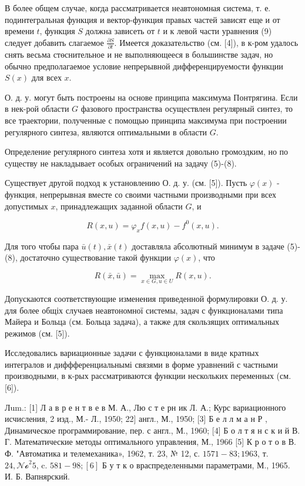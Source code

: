\documentclass[10pt]{article}
\begin{document}
В более общем случае, когда рассматривается неавтономная система, т. е. подинтегральная функция и вектор-функция правых частей зависят еще и от времени $t$, функция $S$ должна зависеть от $t$ и к левой части уравнения (9) следует добавить слагаемое $\frac{\partial S}{\partial t}$. Имеется доказательство (см. [4]), в к-ром удалось снять весьма стөснительное и не выполняющееся в большинстве задач, но обычно предполагаемое условие непрерывной дифференцируемости функции $S(x)$ для всех $x$.

О. д. у. могут быть построены на основе принципа максимума Понтрягина. Если в нек-рой области $G$ фазового пространства осуществлен регулярный синтез, то все траектории, полученные с помощью принципа максимума при построении регулярного синтеза, являются оптимальными в области $G$.

Определение регулярного синтеза хотя и является довольно громоздким, но по существу не накладывает особых ограничений на задачу (5)-(8).

Существует другой подход к установлению О. д. у. (см. [5]). Пусть $\varphi(x)$ - функция, непрерывная вместе со своими частными производными при всех допустимых $x$, принадлежащих заданной области $G$, и

\[
R(x, u)=\varphi_{x} f(x, u)-f^{0}(x, u) .
\]

Для того чтобы пара $\bar{u}(t), \bar{x}(t)$ доставляла абсолютный минимум в задаче (5)-(8), достаточно существование такой функции $\varphi(x)$, что

\[
R(\bar{x}, \bar{u})=\max _{x \in G, u \in U} R(x, u) .
\]

Допускаются соответствующие изменения приведенной формулировки О. д. у. для более общіх случаев неавтономної системы, задач с функционалами типа Майера и Больца (см. Больца задача), а также для скользящих оптимальных режимов (см. [5]).

Исследовались вариационные задачи с функционалами в виде кратных интегралов и диффференциальнымі связями в форме уравнений с частными производными, в к-рых рассматриваются функции нескольких переменных (см. [6]).

Лum.: [1] Л а в р е н т в е в М. А., Лю с т е рн ик Л. А.; Курс вариационного исчисления, 2 изд., М.- Л., 1950; 22$]$ англ., М., 1950; [3] Б е л л м а н Р , Динамическое программирование, пер. с англ., М., 1960; [4] Б о л т я н с к и й В. Г. Математические методы оптимального управления, М., 1966 [5] К р о т о в В. Ф. "Автоматика и телемеханика», 1962, т. 23, № 12, с. $1571-83 ; 1963$, т. $24, \mathcal{N o}^{2} 5$, c. $581-98 ;[6]$ Б у т к о враспределенными параметрами, М., 1965. И. Б. Вапнярский.
\end{document}

